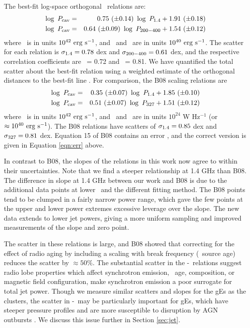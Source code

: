 \documentclass[12pt, preprint]{aastex}
\begin{document}
The best-fit log-space orthogonal \bces\ relations are:
\begin{eqnarray}
  \log~P_{\rm{cav}} &=& 0.75~(\pm 0.14)~\log~P_{\rm{1.4}} + 1.91~(\pm 0.18) \label{eqn:high}\\
  \log~P_{\rm{cav}} &=& 0.64~(\pm 0.09)~\log~P_{\rm{200-400}} + 1.54~(\pm 0.12) \label{eqn:low}
\end{eqnarray}
where \pcav\ is in units $10^{42} ~\rm{\mbox{\ensuremath{\rm{erg}}}~\ensuremath{\rm{\mbox{\ensuremath{\rm{s}}}^{-1}}}}$, and \phigh\ and \plow\ are
in units $10^{40} ~\rm{\mbox{\ensuremath{\rm{erg}}}~\ensuremath{\rm{\mbox{\ensuremath{\rm{s}}}^{-1}}}}$. The scatter for each relation is $\sigma_{\rm{1.4}} =
0.78$ dex and $\sigma_{\rm{200-400}} = 0.61$ dex, and the respective correlation
coefficients are \rhigh\ = 0.72 and \rlow\ = 0.81. We have quantified
the total scatter about the best-fit relation using a weighted
estimate of the orthogonal distances to the best-fit line
\citep[see][]{2009A&A...498..361P}. For comparison, the B08 scaling
relations are
\begin{eqnarray}
  \log~P_{\rm{cav}} &=& 0.35~(\pm 0.07)~\log~P_{\rm{1.4}} + 1.85~(\pm 0.10) \\
  \log~P_{\rm{cav}} &=& 0.51~(\pm 0.07)~\log~P_{\rm{327}} + 1.51~(\pm 0.12) \label{eqn:err}
\end{eqnarray}
where \pcav\ is in units $10^{42} ~\rm{\mbox{\ensuremath{\rm{erg}}}~\ensuremath{\rm{\mbox{\ensuremath{\rm{s}}}^{-1}}}}$, and \phigh\ and \pthree\ are
in units $10^{24}$ W Hz$^{-1}$ (or $\approx 10^{40} ~\rm{\mbox{\ensuremath{\rm{erg}}}~\ensuremath{\rm{\mbox{\ensuremath{\rm{s}}}^{-1}}}}$). The B08
relations have scatters of $\sigma_{\rm{1.4}} = 0.85$ dex and $\sigma_{\rm{327}} = 0.81$
dex. Equation 15 of B08 contains an error \citep{birzan08err}, and the
correct version is given in Equation \ref{eqn:err} above.

In contrast to B08, the slopes of the relations in this work now agree
to within their uncertainties. Note that we find a steeper
relationship at 1.4 GHz than B08. The difference in slope at 1.4 GHz
between our work and B08 is due to the additional data points at lower
\pjet\ and the different fitting method. The B08 points tend to be
clumped in a fairly narrow power range, which gave the few points at
the upper and lower power extremes excessive leverage over the
slope. The new data extends to lower jet powers, giving a more uniform
sampling and improved measurements of the slope and zero point.

The scatter in these relations is large, and B08 showed that
correcting for the effect of radio aging by including a scaling with
break frequency (\ie\ source age) reduces the scatter by $\approx
50\%$. The substantial scatter in the \pjet-\prad\ relations suggest
radio lobe properties which affect synchrotron emission, \eg\ age,
composition, or magnetic field configuration, make synchrotron
emission a poor surrogate for total jet power. Though we measure
similar scatters and slopes for the gEs as the clusters, the scatter
in \pjet-\prad\ may be particularly important for gEs, which have
steeper pressure profiles and are more susceptible to disruption by
AGN outbursts \citep{2006MNRAS.372.1161W, 2008ApJ...687L..53P}. We
discuss this issue further in Section \ref{sec:jet}.
\end{document}
